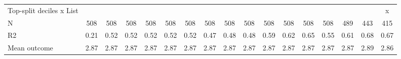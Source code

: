 \begin{tabular}{lcccccccccccccccc}
Top-split deciles x List&                     &                     &                     &                     &                     &                     &                     &                     &                     &                     &                     &                     &                     &                     &                     &           x         \\
N           &         508         &         508         &         508         &         508         &         508         &         508         &         508         &         508         &         508         &         508         &         508         &         508         &         508         &         489         &         443         &         415         \\
R2          &        0.21         &        0.52         &        0.52         &        0.52         &        0.52         &        0.52         &        0.47         &        0.48         &        0.48         &        0.59         &        0.62         &        0.65         &        0.55         &        0.61         &        0.68         &        0.67         \\
Mean outcome&        2.87         &        2.87         &        2.87         &        2.87         &        2.87         &        2.87         &        2.87         &        2.87         &        2.87         &        2.87         &        2.87         &        2.87         &        2.87         &        2.87         &        2.89         &        2.86         \\
\bottomrule \end{tabular}
